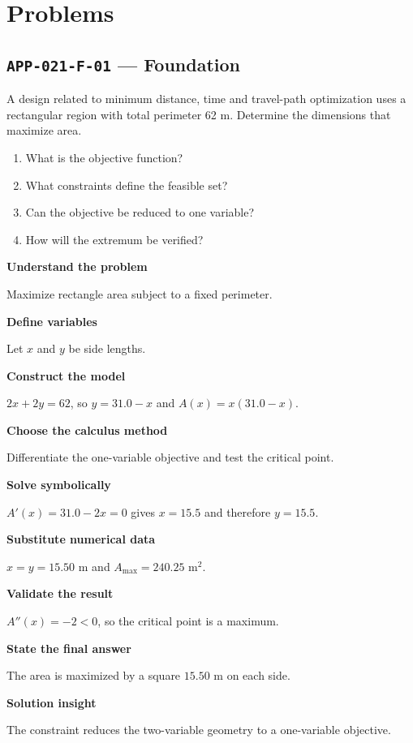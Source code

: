 \documentclass[11pt]{book}
\newcommand{\pid}[1]{\texttt{#1}}
\begin{document}
\section*{Problems}
\subsection*{\pid{APP-021-F-01} — Foundation}
\begin{problembox}
A design related to minimum distance, time and travel-path optimization uses a rectangular region with total perimeter 62 m. Determine the dimensions that maximize area.
\end{problembox}
\begin{promptbox}\begin{enumerate}
\item What is the objective function?
\item What constraints define the feasible set?
\item Can the objective be reduced to one variable?
\item How will the extremum be verified?
\end{enumerate}\end{promptbox}
\begin{solutionbox}
\textbf{Understand the problem}\par Maximize rectangle area subject to a fixed perimeter.\par\medskip
\textbf{Define variables}\par Let $x$ and $y$ be side lengths.\par\medskip
\textbf{Construct the model}\par $2x+2y=62$, so $y=31.0-x$ and $A(x)=x(31.0-x)$.\par\medskip
\textbf{Choose the calculus method}\par Differentiate the one-variable objective and test the critical point.\par\medskip
\textbf{Solve symbolically}\par $A'(x)=31.0-2x=0$ gives $x=15.5$ and therefore $y=15.5$.\par\medskip
\textbf{Substitute numerical data}\par $x=y=15.50$ m and $A_{\max}=240.25$ m$^2$.\par\medskip
\textbf{Validate the result}\par $A''(x)=-2<0$, so the critical point is a maximum.\par\medskip
\textbf{State the final answer}\par The area is maximized by a square $15.50$ m on each side.\par\medskip
\textbf{Solution insight}\par The constraint reduces the two-variable geometry to a one-variable objective.\par\medskip
\end{solutionbox}
\end{document}
